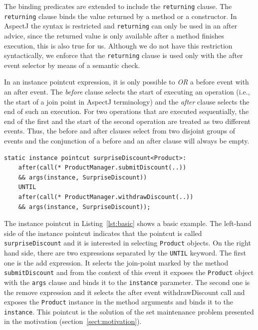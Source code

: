 \documentclass[10pt]{sigplanconf}
\newcommand{\lstinln}[1]{\lstinline~#1~}
\begin{document}
The binding predicates are extended to include the \lstinln{returning} clause.
The \lstinln{returning} clause binds the value returned by a method or a constructor.
In AspectJ the syntax is restricted and \lstinln{returning} can only be used in an after advice, since the returned value is only available after a method finishes execution, this is also true for us.
Although we do not have this restriction syntactically, we enforce that the \lstinln{returning} clause is used only with the after event selector by means of a semantic check.

In an instance pointcut expression, it is only possible to \emph{OR} a before event with an after event.
The \emph{before} clause selects the start of executing an operation (i.e., the start of a join point in AspectJ terminology) and the \emph{after} clause selects the end of such an execution.
For two operations that are executed sequentially, the end of the first and the start of the second operation are treated as two different events.
Thus, the before and after clauses select from two disjoint groups of events and the conjunction of a before and an after clause will always be empty.

\begin{lstlisting}[float=h!, caption={A basic instance pointcut declaration with add and remove expressions}, label={lst:basic}]
static instance pointcut surpriseDiscount<Product>:
	after(call(* ProductManager.submitDiscount(..))
	&& args(instance, SurpriseDiscount))
	UNTIL
	after(call(* ProductManager.withdrawDiscount(..))
	&& args(instance, SurpriseDiscount));
\end{lstlisting}

The instance pointcut in Listing~\ref{lst:basic} shows a basic example. The left-hand side of the instance pointcut indicates that the pointcut is called \lstinln{surpriseDiscount} and it is interested in selecting \lstinln{Product} objects.
On the right hand side, there are two expressions separated by the \lstinln{UNTIL} keyword. The first one is the add expression. It selects the join-point marked by the method \lstinln{submitDiscount} and from the context of this event it exposes the \lstinln{Product} object with the \lstinln{args} clause and binds it to the \lstinln{instance} parameter.
The second one is the remove expression and it selects the after event \textsf{withdrawDiscount} call and exposes the \lstinln{Product} instance in the method arguments and binds it to the \lstinln{instance}.
This pointcut is the solution of the set maintenance problem presented in the motivation (section~\ref{sect:motivation}).
\end{document}
